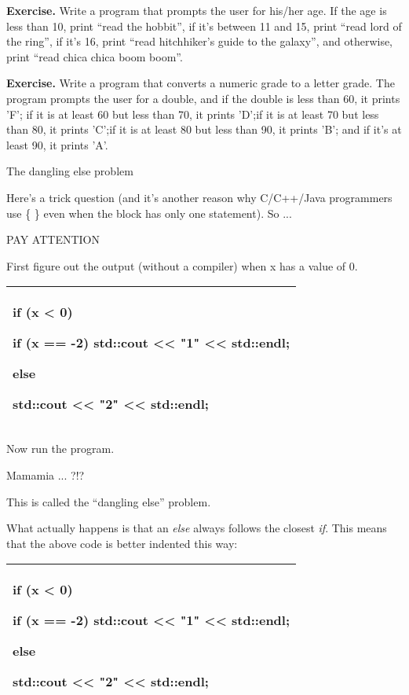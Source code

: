 \documentclass[
]{article}
\begin{document}
\textbf{Exercise.} Write a program that prompts the user for his/her
age. If the age is less than 10, print ``read the hobbit'', if it's
between 11 and 15, print ``read lord of the ring'', if it's 16, print
``read hitchhiker's guide to the galaxy'', and otherwise, print ``read
chica chica boom boom''.

\textbf{Exercise.} Write a program that converts a numeric grade to a
letter grade. The program prompts the user for a double, and if the
double is less than 60, it prints 'F'; if it is at least 60 but less
than 70, it prints 'D';if it is at least 70 but less than 80, it prints
'C';if it is at least 80 but less than 90, it prints 'B'; and if it's at
least 90, it prints 'A'.

The dangling else problem

Here's a trick question (and it's another reason why C/C++/Java
programmers use \{ \} even when the block has only one statement). So
...

PAY ATTENTION

First figure out the output (without a compiler) when x has a value of
0.

\begin{longtable}[]{@{}l@{}}
\toprule
\endhead
\begin{minipage}[t]{0.97\columnwidth}\raggedright
if (x \textless{} 0)

if (x == -2) std::cout \textless\textless{} "1" \textless\textless{}
std::endl;

else

std::cout \textless\textless{} "2" \textless\textless{} std::endl;\strut
\end{minipage}\tabularnewline
\bottomrule
\end{longtable}

Now run the program.

Mamamia ... ?!?

This is called the ``dangling else'' problem.

What actually happens is that an \emph{else} always follows the closest
\emph{if}. This means that the above code is better indented this way:

\begin{longtable}[]{@{}l@{}}
\toprule
\endhead
\begin{minipage}[t]{0.97\columnwidth}\raggedright
if (x \textless{} 0)

if (x == -2) std::cout \textless\textless{} "1" \textless\textless{}
std::endl;

else

std::cout \textless\textless{} "2" \textless\textless{} std::endl;\strut
\end{minipage}\tabularnewline
\bottomrule
\end{longtable}
\end{document}
